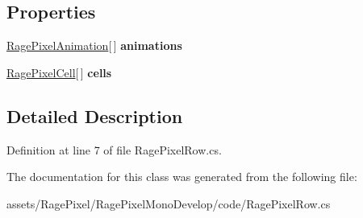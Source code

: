 \subsection*{Properties}
\begin{DoxyCompactItemize}
\item 
\hypertarget{class_rage_pixel_row_a5ac6ee945a82fa93c7f6577924827195}{\hyperlink{class_rage_pixel_animation}{Rage\-Pixel\-Animation}\mbox{[}$\,$\mbox{]} {\bfseries animations}}\label{class_rage_pixel_row_a5ac6ee945a82fa93c7f6577924827195}

\item 
\hypertarget{class_rage_pixel_row_a161e9694ee59d2099bc1a5062088642b}{\hyperlink{class_rage_pixel_cell}{Rage\-Pixel\-Cell}\mbox{[}$\,$\mbox{]} {\bfseries cells}}\label{class_rage_pixel_row_a161e9694ee59d2099bc1a5062088642b}

\end{DoxyCompactItemize}


\subsection{Detailed Description}


Definition at line 7 of file Rage\-Pixel\-Row.\-cs.



The documentation for this class was generated from the following file\-:\begin{DoxyCompactItemize}
\item 
assets/\-Rage\-Pixel/\-Rage\-Pixel\-Mono\-Develop/code/Rage\-Pixel\-Row.\-cs\end{DoxyCompactItemize}

